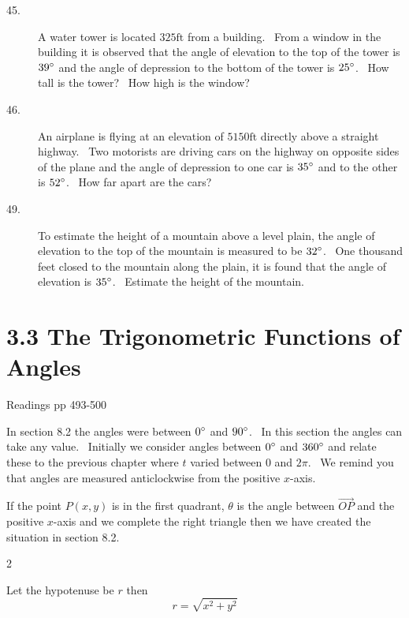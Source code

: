 \begin{description}
\item [45.]
A water tower is located $325 \mbox{ft}$ from a building. \ From a window in the building
it is observed that the angle of elevation to the top of the tower is $39 \mbox{{\ensuremath{{}^\circ}}}$ and the angle of depression to the bottom of the tower is $25 \mbox{{\ensuremath{{}^\circ}}}$. \ How tall is the tower? \ How
high is the window? 

\item [46.] An airplane is flying at an
elevation of $5150 \mbox{ft}$ directly above a straight highway. \ Two motorists
are driving cars on the highway on opposite sides of the plane and the angle of depression to one car is $35 \mbox{{\ensuremath{{}^\circ}}}$ and to the other is $52 \mbox{{\ensuremath{{}^\circ}}}$. \ How far apart are the cars? 

\item [49.]
To estimate the height of a mountain above a level plain, the angle of elevation to the top of the mountain is measured to be $32 \mbox{{\ensuremath{{}^\circ}}}$. \ One thousand feet closed to the mountain along
the plain, it is found that the angle of elevation is $35 \mbox{{\ensuremath{{}^\circ}}}$. \ Estimate the height of the mountain. \end{description}

 

\section{3.3 The Trigonometric Functions of Angles}
Readings pp 493-500 

In section 8.2 the angles were between $0 \mbox{{\ensuremath{{}^\circ}}}$ and $90 \mbox{{\ensuremath{{}^\circ}}}$. \ In this section the angles can take any value.
\ Initially we consider angles between $0 \mbox{{\ensuremath{{}^\circ}}}$ and $360 \mbox{{\ensuremath{{}^\circ}}}$ and relate these to the previous chapter where $t$ varied between $0$ and $2 \pi $. \ We remind you that angles are measured anticlockwise from the positive $x$-axis. 

If the point $P (x ,y)$ is in the first quadrant, $\theta $ is the angle between $\vec{OP}$ and the positive $x$-axis and we complete the right triangle then we have created the situation in section 8.2.  
\columnsep =30pt
\begin {multicols}{2}
 

   
\setlength\fboxrule{0in}\setlength\fboxsep{0.2in}


Let the hypotenuse be $r$ then
\begin{equation*}r =\sqrt{x^{2} +y^{2}}
\end{equation*}


\end {multicols}


